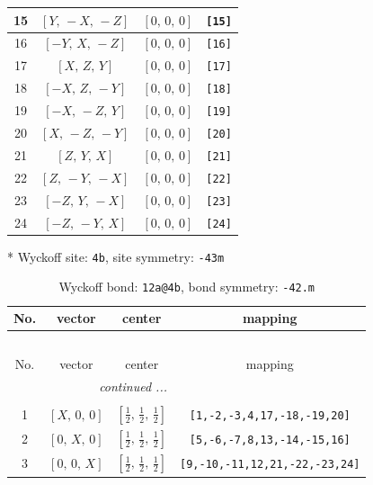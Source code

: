 \documentclass[fleqn,8pt]{jsarticle}
\begin{document}
\begin{longtable}{cccc}
15 & $\left[ Y,\, - X,\, - Z \right]$ & $\left[ 0,\, 0,\, 0 \right]$ & {\tt [15]} \\ \hline
16 & $\left[ - Y,\, X,\, - Z \right]$ & $\left[ 0,\, 0,\, 0 \right]$ & {\tt [16]} \\ \hline
17 & $\left[ X,\, Z,\, Y \right]$ & $\left[ 0,\, 0,\, 0 \right]$ & {\tt [17]} \\ \hline
18 & $\left[ - X,\, Z,\, - Y \right]$ & $\left[ 0,\, 0,\, 0 \right]$ & {\tt [18]} \\ \hline
19 & $\left[ - X,\, - Z,\, Y \right]$ & $\left[ 0,\, 0,\, 0 \right]$ & {\tt [19]} \\ \hline
20 & $\left[ X,\, - Z,\, - Y \right]$ & $\left[ 0,\, 0,\, 0 \right]$ & {\tt [20]} \\ \hline
21 & $\left[ Z,\, Y,\, X \right]$ & $\left[ 0,\, 0,\, 0 \right]$ & {\tt [21]} \\ \hline
22 & $\left[ Z,\, - Y,\, - X \right]$ & $\left[ 0,\, 0,\, 0 \right]$ & {\tt [22]} \\ \hline
23 & $\left[ - Z,\, Y,\, - X \right]$ & $\left[ 0,\, 0,\, 0 \right]$ & {\tt [23]} \\ \hline
24 & $\left[ - Z,\, - Y,\, X \right]$ & $\left[ 0,\, 0,\, 0 \right]$ & {\tt [24]} \\
\end{longtable}
* Wyckoff site: {\tt 4b}, site symmetry: {\tt -43m}
\renewcommand{\arraystretch}{1.2}
\begin{longtable}{cccc}
\caption{Wyckoff bond: {\tt 12a@4b}, bond symmetry: {\tt -42.m}}
 \\
 \hline \hline
No. & vector & center & mapping \\ \hline \endfirsthead

\multicolumn{3}{l}{\tablename\ \thetable{}} \\
 \hline \hline
No. & vector & center & mapping \\ \hline \endhead

 \hline \hline
\multicolumn{3}{r}{\footnotesize\it continued ...} \\ \endfoot

 \hline \hline
\multicolumn{3}{r}{} \\ \endlastfoot

1 & $\left[ X,\, 0,\, 0 \right]$ & $\left[ \frac{1}{2},\, \frac{1}{2},\, \frac{1}{2} \right]$ & {\tt [1,-2,-3,4,17,-18,-19,20]} \\ \hline
2 & $\left[ 0,\, X,\, 0 \right]$ & $\left[ \frac{1}{2},\, \frac{1}{2},\, \frac{1}{2} \right]$ & {\tt [5,-6,-7,8,13,-14,-15,16]} \\ \hline
3 & $\left[ 0,\, 0,\, X \right]$ & $\left[ \frac{1}{2},\, \frac{1}{2},\, \frac{1}{2} \right]$ & {\tt [9,-10,-11,12,21,-22,-23,24]} \\
\end{longtable}
\end{document}
